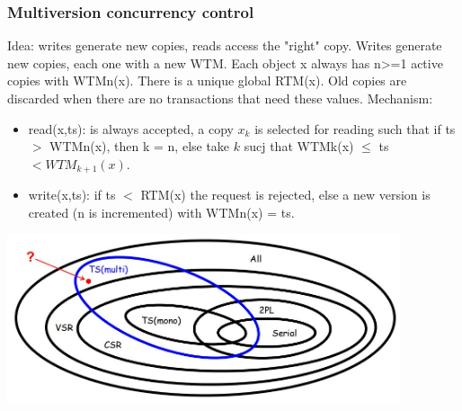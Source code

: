 \subsubsection{Multiversion concurrency control}
Idea: writes generate new copies, reads access the
"right" copy.\newline
\newline
Writes generate new copies, each one with a new WTM.
Each object x always has n>=1 active copies with
WTMn(x). There is a unique global RTM(x).\newline
\newline
Old copies are discarded when there are no
transactions that need these values.
\newline
\newline
Mechanism:
\begin{itemize}
    \item read(x,ts): is always accepted, a copy $x_k$ is selected for reading such that if ts $>$ WTMn(x), then k = n, else take $k$ sucj that WTMk(x) $\leq$ ts $< WTM_{k+1}(x)$. 
    \item write(x,ts): if ts $<$ RTM(x) the request is rejected, else a new version is created (n is incremented) with WTMn(x) = ts.
\end{itemize}
\begin{center}
    \includegraphics[height=5cm]{../arguments/multiversionts.JPG}
\end{center}